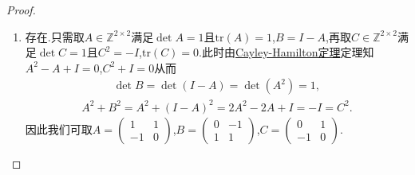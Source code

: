\documentclass[../../main.tex]{subfiles}%
\begin{document}
\begin{proof}
\begin{enumerate}[(1)]
\item 存在.只需取$A\in \mathbb{Z}^{2 \times 2}$满足$\det A = 1$且$\mathrm{tr}(A) = 1$,$B = I - A$,再取$C\in \mathbb{Z}^{2 \times 2}$满足$\det C = 1$且$C^2 = -I$,$\mathrm{tr}(C) = 0$.此时由\hyperref[theorem:Cayley-Hamilton定理]{Cayley-Hamilton定理}定理知$A^2 - A + I = 0$,$C^2 + I = 0$从而
\begin{align*}
\det B = \det(I - A) = \det(A^2) = 1,
\end{align*}
\begin{align*}
A^2 + B^2 = A^2 + (I - A)^2 = 2A^2 - 2A + I = -I = C^2.
\end{align*}
因此我们可取$A = \begin{pmatrix} 1 & 1 \\ -1 & 0 \end{pmatrix}$,$B = \begin{pmatrix} 0 & -1 \\ 1 & 1 \end{pmatrix}$,$C = \begin{pmatrix} 0 & 1 \\ -1 & 0 \end{pmatrix}$.
\end{enumerate}
\end{proof}
\end{document}
